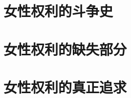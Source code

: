 \documentclass[t, 10pt, aspectratio=169]{ctexbeamer}
\begin{document}
    
    \section{女性权利的斗争史}
    \section{女性权利的缺失部分}
    \section{女性权利的真正追求}
    
\end{document}
